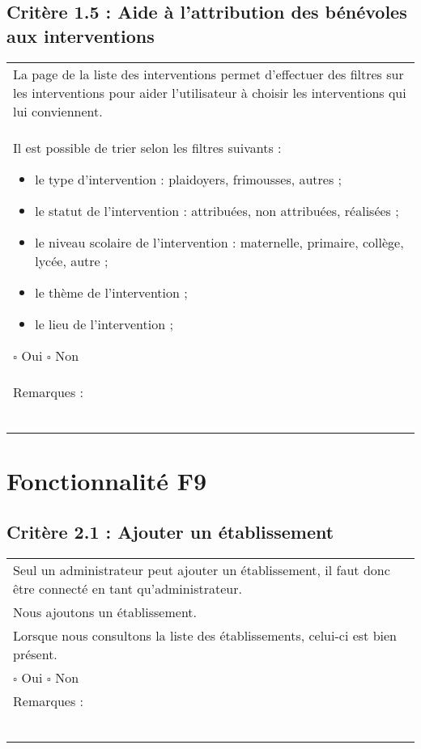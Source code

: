 	\subsection*{Critère 1.5 : Aide à l’attribution des bénévoles aux interventions}
	
		\begin{center}
    	 		\begin{tabular}[h]{|p{}|}
			\hline
				La page de la liste des interventions permet d’effectuer des filtres sur les interventions pour aider l’utilisateur à choisir les interventions qui lui conviennent.\\
Il est possible de trier selon les filtres suivants :
		\begin{itemize}
			\item le type d’intervention : plaidoyers, frimousses, autres ;
			\item le statut de l’intervention : attribuées, non attribuées, réalisées ;
			\item le niveau scolaire de l’intervention : maternelle, primaire, collège, lycée, autre ;
			\item le thème de l’intervention ;
			\item le lieu de l’intervention ;
		\end{itemize}
				
				$\square$ Oui \hfill \hfill $\square$ Non \\\hline Remarques : \\ ~\\
			 \\\hline
     		\end{tabular}
  		\end{center}	
  		
  		
\section{Fonctionnalité F9}
  		
  	\subsection*{Critère 2.1 : Ajouter un établissement}
  		\begin{center}
    	 		\begin{tabular}[h]{|p{}|}
			\hline
				Seul un administrateur peut ajouter un établissement, il faut donc être connecté en tant qu'administrateur.\\
				Nous ajoutons un établissement. \\
				Lorsque nous consultons la liste des établissements, celui-ci est bien présent. \\
						
				
				$\square$ Oui  \hfill \hfill $\square$ Non \\\hline Remarques : \\ ~\\
			 \\\hline
     		\end{tabular}
  		\end{center}	
  		
